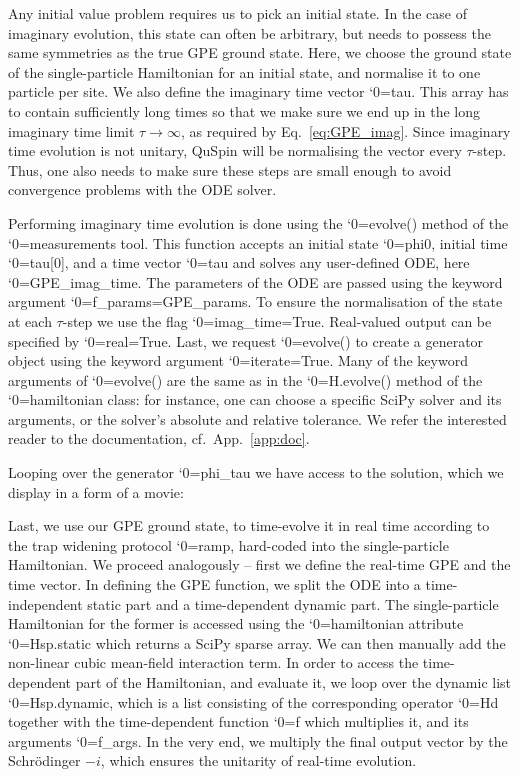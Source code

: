 \documentclass{SciPost}
\newcommand\0{\scalebox{-1}[1]{0}}
\let\svttfamily\ttfamily
\renewcommand\ttfamily{\svttfamily\catcode`0=\active }
\renewcommand\texttt{\bgroup\ttfamily\texttthelp}
\def\texttthelp#1{#1\egroup}
\newcommand{\GPcode}{example4.py}
\begin{document}

Any initial value problem requires us to pick an initial state. In the case of imaginary evolution, this state can often be arbitrary, but needs to possess the same symmetries as the true GPE ground state. Here, we choose the ground state of the single-particle Hamiltonian for an initial state, and normalise it to one particle per site. We also define the imaginary time vector \texttt{tau}. This array has to contain sufficiently long times so that we make sure we end up in the long imaginary time limit $\tau\to\infty$, as required by Eq.~\eqref{eq:GPE_imag}. Since imaginary time evolution is not unitary, QuSpin will be normalising the vector every $\tau$-step. Thus, one also needs to make sure these steps are small enough to avoid convergence problems with the ODE solver.

Performing imaginary time evolution is done using the \texttt{evolve()} method of the \texttt{measurements} tool. This function accepts an initial state \texttt{phi0}, initial time \texttt{tau[0]}, and a time vector \texttt{tau} and solves any user-defined ODE, here \texttt{GPE\_imag\_time}. The parameters of the ODE are passed using the keyword argument \texttt{f\_params=GPE\_params}. To ensure the normalisation of the state at each $\tau$-step we use the flag \texttt{imag\_time=True}. Real-valued output can be specified by \texttt{real=True}. Last, we request \texttt{evolve()} to create a generator object using the keyword argument \texttt{iterate=True}. Many of the keyword arguments of \texttt{evolve()} are the same as in the \texttt{H.evolve()} method of the \texttt{hamiltonian} class: for instance, one can choose a specific SciPy solver and its arguments, or the solver's absolute and relative tolerance. We refer the interested reader to the documentation, cf.~App.~\ref{app:doc}.

Looping over the generator \texttt{phi\_tau} we have access to the solution, which we display in a form of a movie:

Last, we use our GPE ground state, to time-evolve it in real time according to the trap widening protocol \texttt{ramp}, hard-coded into the single-particle Hamiltonian. We proceed analogously -- first we define the real-time GPE and the time vector. In defining the GPE function, we split the ODE into a time-independent static part and a time-dependent dynamic part. The single-particle Hamiltonian for the former is accessed using the \texttt{hamiltonian} attribute \texttt{Hsp.static} which returns a SciPy sparse array. We can then manually add the non-linear cubic mean-field interaction term. In order to access the time-dependent part of the Hamiltonian, and evaluate it, we loop over the dynamic list \texttt{Hsp.dynamic}, which is a list consisting of the corresponding operator \texttt{Hd} together with the time-dependent function \texttt{f} which multiplies it, and its arguments \texttt{f\_args}. In the very end, we multiply the final output vector by the Schr\"odinger $-i$, which ensures the unitarity of real-time evolution.
\end{document}

